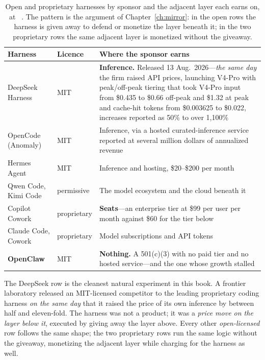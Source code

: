 \begin{table}[htbp]
  \centering\footnotesize
  \caption{Open and proprietary harnesses by sponsor and the adjacent layer each earns on, at \datafreeze~\cite{harness-sponsors,harness-field}. The pattern is the argument of Chapter~\ref{ch:mirror}: in the open rows the harness is given away to defend or monetize the layer beneath it; in the two proprietary rows the same adjacent layer is monetized without the giveaway.}
  \label{tab:harness-sponsors}
  \begin{tabular}{@{}p{30mm}p{20mm}p{88mm}@{}}
    \toprule
    \textbf{Harness} & \textbf{Licence} & \textbf{Where the sponsor earns} \\
    \midrule
    DeepSeek Harness & MIT & \textbf{Inference.} Released 13 Aug.\ 2026---\emph{the same day} the firm raised API prices, launching V4-Pro with peak/off-peak tiering that took V4-Pro input from \$0.435 to \$0.66 off-peak and \$1.32 at peak and cache-hit tokens from \$0.003625 to \$0.022, increases reported as 50\% to over 1,100\% \\
    \addlinespace
    OpenCode (Anomaly) & MIT & Inference, via a hosted curated-inference service reported at several million dollars of annualized revenue \\
    \addlinespace
    Hermes Agent & MIT & Inference and hosting, \$20--\$200 per month \\
    \addlinespace
    Qwen Code, Kimi Code & permissive & The model ecosystem and the cloud beneath it \\
    \addlinespace
    Copilot Cowork & proprietary & \textbf{Seats}---an enterprise tier at \$99 per user per month against \$60 for the tier below \\
    \addlinespace
    Claude Code, Cowork & proprietary & Model subscriptions and API tokens \\
    \addlinespace
    \textbf{OpenClaw} & MIT & \textbf{Nothing.} A 501(c)(3) with no paid tier and no hosted service---and the one whose growth stalled \\
    \bottomrule
  \end{tabular}
\end{table}

The DeepSeek row is the cleanest natural experiment in this book. A frontier laboratory released an MIT-licensed competitor to the leading proprietary coding harness \emph{on the same day} that it raised the price of its own inference by between half and eleven-fold. The harness was not a product; it was a \emph{price move on the layer below it}, executed by giving away the layer above. Every other \emph{open-licensed} row follows the same shape; the two proprietary rows run the same logic without the giveaway, monetizing the adjacent layer while charging for the harness as well.


